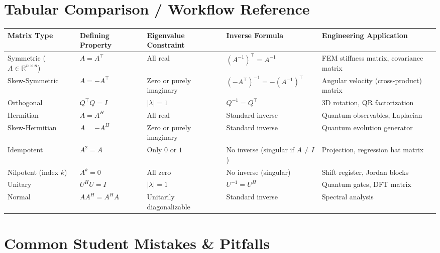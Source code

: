 \documentclass[12pt,a4paper]{article}
\begin{document}
\section{Tabular Comparison / Workflow Reference}

\begin{center}
\renewcommand{\arraystretch}{1.4}
\begin{tabular}{@{}p{3.2cm} p{3.4cm} p{3.2cm} p{2.0cm} p{3.5cm}@{}}
\toprule
\textbf{Matrix Type} & \textbf{Defining Property} & \textbf{Eigenvalue Constraint} & \textbf{Inverse Formula} & \textbf{Engineering Application} \\
\midrule
Symmetric ($A \in \mathbb{R}^{n\times n}$) & $A = A^\top$ & All real & $(A^{-1})^\top = A^{-1}$ & FEM stiffness matrix, covariance matrix \\
Skew-Symmetric & $A = -A^\top$ & Zero or purely imaginary & $(-A^\top)^{-1} = -(A^{-1})^\top$ & Angular velocity (cross-product) matrix \\
Orthogonal & $Q^\top Q = I$ & $|\lambda| = 1$ & $Q^{-1} = Q^\top$ & 3D rotation, QR factorization \\
Hermitian & $A = A^H$ & All real & Standard inverse & Quantum observables, Laplacian \\
Skew-Hermitian & $A = -A^H$ & Zero or purely imaginary & Standard inverse & Quantum evolution generator \\
Idempotent & $A^2 = A$ & Only $0$ or $1$ & No inverse (singular if $A \neq I$) & Projection, regression hat matrix \\
Nilpotent (index $k$) & $A^k = 0$ & All zero & No inverse (singular) & Shift register, Jordan blocks \\
Unitary & $U^H U = I$ & $|\lambda| = 1$ & $U^{-1} = U^H$ & Quantum gates, DFT matrix \\
Normal & $AA^H = A^H A$ & Unitarily diagonalizable & Standard inverse & Spectral analysis \\
\bottomrule
\end{tabular}
\end{center}

\section{Common Student Mistakes \& Pitfalls}
\end{document}
